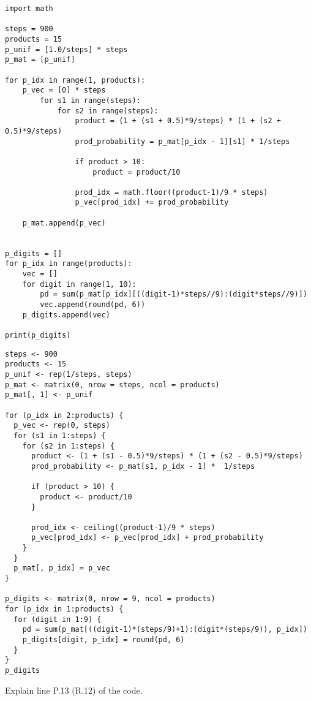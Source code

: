 \documentclass[assignments]{subfiles}
\begin{document}
\begin{verbatim}
import math

steps = 900
products = 15
p_unif = [1.0/steps] * steps
p_mat = [p_unif]

for p_idx in range(1, products):
    p_vec = [0] * steps
        for s1 in range(steps):
            for s2 in range(steps):
                product = (1 + (s1 + 0.5)*9/steps) * (1 + (s2 + 0.5)*9/steps)
                prod_probability = p_mat[p_idx - 1][s1] * 1/steps

                if product > 10:
                    product = product/10

                prod_idx = math.floor((product-1)/9 * steps)
                p_vec[prod_idx] += prod_probability

    p_mat.append(p_vec)


p_digits = []
for p_idx in range(products):
    vec = []
    for digit in range(1, 10):
        pd = sum(p_mat[p_idx][((digit-1)*steps//9):(digit*steps//9)])
        vec.append(round(pd, 6))
    p_digits.append(vec)

print(p_digits)
\end{verbatim}


\begin{verbatim}
steps <- 900
products <- 15
p_unif <- rep(1/steps, steps)
p_mat <- matrix(0, nrow = steps, ncol = products)
p_mat[, 1] <- p_unif

for (p_idx in 2:products) {
  p_vec <- rep(0, steps)
  for (s1 in 1:steps) {
    for (s2 in 1:steps) {
      product <- (1 + (s1 - 0.5)*9/steps) * (1 + (s2 - 0.5)*9/steps)
      prod_probability <- p_mat[s1, p_idx - 1] *  1/steps

      if (product > 10) {
        product <- product/10
      }

      prod_idx <- ceiling((product-1)/9 * steps)
      p_vec[prod_idx] <- p_vec[prod_idx] + prod_probability
    }
  }
  p_mat[, p_idx] = p_vec
}

p_digits <- matrix(0, nrow = 9, ncol = products)
for (p_idx in 1:products) {
  for (digit in 1:9) {
    pd = sum(p_mat[((digit-1)*(steps/9)+1):(digit*(steps/9)), p_idx])
    p_digits[digit, p_idx] = round(pd, 6)
  }
}
p_digits
\end{verbatim}

\vspace{5pt}

\begin{exercise}
Explain line P.13 (R.12) of the code.

\end{exercise}
\end{document}
